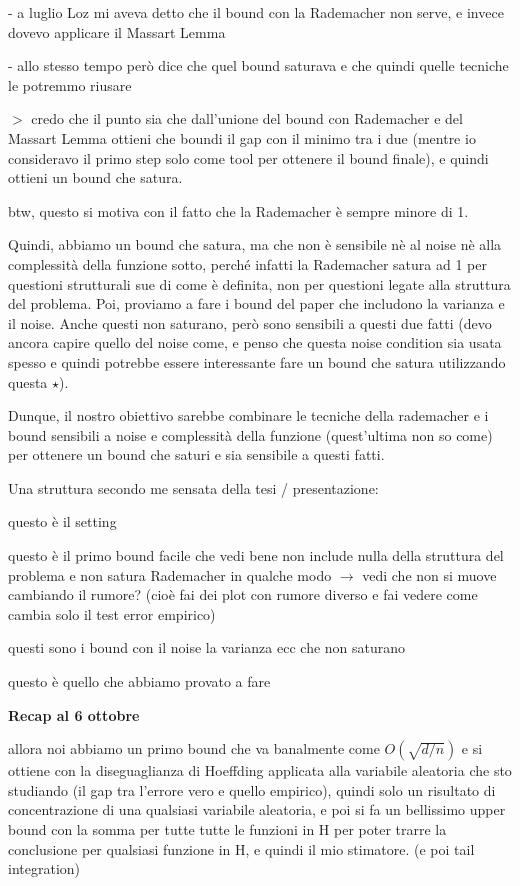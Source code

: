 \documentclass{amsart}
\begin{document}
- a luglio Loz mi aveva detto che il bound con la Rademacher non serve, e invece dovevo applicare il Massart Lemma

- allo stesso tempo però dice che quel bound saturava e che quindi quelle tecniche le potremmo riusare

$>$ credo che il punto sia che dall'unione del bound con Rademacher e del Massart Lemma ottieni che boundi il gap con il minimo tra i due (mentre io consideravo il primo step solo come tool per ottenere il bound finale), e quindi ottieni un bound che satura. 

btw, questo si motiva con il fatto che la Rademacher è sempre minore di 1. 

Quindi, abbiamo un bound che satura, ma che non è sensibile nè al noise nè alla complessità della funzione sotto, perché infatti la Rademacher satura ad 1 per questioni strutturali sue di come è definita, non per questioni legate alla struttura del problema. 
Poi, proviamo a fare i bound del paper che includono la varianza e il noise. Anche questi non saturano, però sono sensibili a questi due fatti (devo ancora capire quello del noise come, e penso che questa noise condition sia usata spesso e quindi potrebbe essere interessante fare un bound che satura utilizzando questa $\star$).

Dunque, il nostro obiettivo sarebbe combinare le tecniche della rademacher e i bound sensibili a noise e complessità della funzione (quest'ultima non so come) per ottenere un bound che saturi e sia sensibile a questi fatti. 

Una struttura secondo me sensata della tesi / presentazione:

questo è il setting

questo è il primo bound facile che vedi bene non include nulla della struttura del problema e non satura
Rademacher in qualche modo $\rightarrow$ vedi che non si muove cambiando il rumore? (cioè fai dei plot con rumore diverso e fai vedere come cambia solo il test error empirico)

questi sono i bound con il noise la varianza ecc che non saturano 

questo è quello che abbiamo provato a fare
\bigskip 

{\bf\Large Recap al 6 ottobre}


allora noi abbiamo un primo bound che va banalmente come $O\left(\sqrt{d/n}\right)$ e si ottiene con la diseguaglianza di Hoeffding applicata alla variabile aleatoria che sto studiando (il gap tra l'errore vero e quello empirico), quindi solo un risultato di concentrazione di una qualsiasi variabile aleatoria, e poi si fa un bellissimo upper bound con la somma per tutte tutte le funzioni in H per poter trarre la conclusione per qualsiasi funzione in H, e quindi il mio stimatore. (e poi tail integration)
\end{document}
